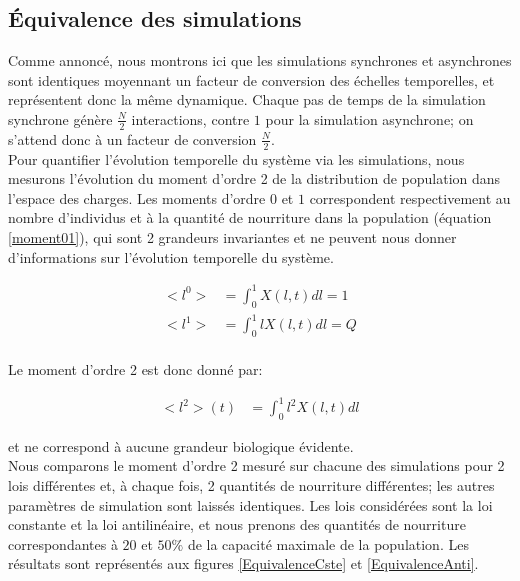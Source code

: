 \clearpage

\subsection{Équivalence des simulations}

Comme annoncé, nous montrons ici que les simulations synchrones et asynchrones sont identiques moyennant un facteur de conversion des échelles temporelles, et représentent donc la même dynamique. Chaque pas de temps de la simulation synchrone génère $\frac{N}{2}$ interactions, contre $1$ pour la simulation asynchrone; on s'attend donc à un facteur de conversion $\frac{N}{2}$.\\

Pour quantifier l'évolution temporelle du système via les simulations, nous mesurons l'évolution du moment d'ordre 2 de la distribution de population dans l'espace des charges. Les moments d'ordre $0$ et $1$ correspondent respectivement au nombre d'individus et à la quantité de nourriture dans la population (équation \ref{moment01}), qui sont 2 grandeurs invariantes et ne peuvent nous donner d'informations sur l'évolution temporelle du système.

\begin{equation}
\begin{aligned}
<l^0> &= \int_0^1 X(l,t) dl = 1\\
<l^1> &= \int_0^1 l X(l,t) dl = Q\\
\end{aligned}
\label{moment01}
\end{equation}

Le moment d'ordre 2 est donc donné par:

\begin{equation}
\begin{aligned}
<l^2>(t) &= \int_0^1 l^2 X(l,t) dl 
\end{aligned}
\label{moment2continu}
\end{equation}

et ne correspond à aucune grandeur biologique évidente.\\

Nous comparons le moment d'ordre 2 mesuré sur chacune des simulations pour 2 lois différentes et, à chaque fois, 2 quantités de nourriture différentes; les autres paramètres de simulation sont laissés identiques. Les lois considérées sont la loi constante et la loi antilinéaire, et nous prenons des quantités de nourriture correspondantes à $20$ et $50\%$ de la capacité maximale de la population. Les résultats sont représentés aux figures \ref{EquivalenceCste} et \ref{EquivalenceAnti}.


